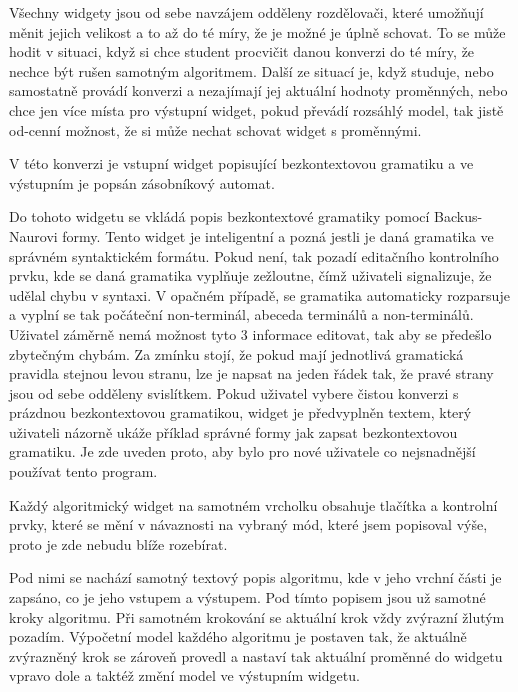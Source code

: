 Všechny widgety jsou od sebe navzájem odděleny rozdělovači, které umožňují měnit jejich velikost a to až do té míry, že je možné je úplně schovat. To se může hodit v situaci, když si chce student procvičit danou konverzi do té míry, že nechce být rušen samotným algoritmem. Další ze situací je, když studuje, nebo samostatně provádí konverzi a nezajímají jej aktuální hodnoty proměnných, nebo chce jen více místa pro výstupní widget, pokud převádí rozsáhlý model, tak jistě od-cenní možnost, že si může nechat schovat widget s proměnnými.

V této konverzi je vstupní widget popisující bezkontextovou gramatiku a ve výstupním je popsán zásobníkový automat.




Do tohoto widgetu se vkládá popis bezkontextové gramatiky pomocí Backus-Naurovi formy. Tento widget je inteligentní a pozná jestli je daná gramatika ve správném syntaktickém formátu. Pokud není, tak pozadí editačního kontrolního prvku, kde se daná gramatika vyplňuje zežloutne, čímž uživateli signalizuje, že udělal chybu v syntaxi. V opačném případě, se gramatika automaticky rozparsuje a vyplní se tak počáteční non-terminál, abeceda terminálů a non-terminálů. Uživatel záměrně nemá možnost tyto 3 informace editovat, tak aby se předešlo zbytečným chybám. Za zmínku stojí, že pokud mají jednotlivá gramatická pravidla stejnou levou stranu, lze je napsat na jeden řádek tak, že pravé strany jsou od sebe odděleny svislítkem. Pokud uživatel vybere čistou konverzi s prázdnou bezkontextovou gramatikou, widget je předvyplněn textem, který uživateli názorně ukáže příklad správné formy jak zapsat bezkontextovou gramatiku. Je zde uveden proto, aby bylo pro nové uživatele co nejsnadnější používat tento program.


Každý algoritmický widget na samotném vrcholku obsahuje tlačítka a kontrolní prvky, které se mění v návaznosti na vybraný mód, které jsem popisoval výše, proto je zde nebudu blíže rozebírat.

Pod nimi se nachází samotný textový popis algoritmu, kde v jeho vrchní části je zapsáno, co je jeho vstupem a výstupem. Pod tímto popisem jsou už samotné kroky algoritmu. Při samotném krokování se aktuální krok vždy zvýrazní žlutým pozadím. Výpočetní model každého algoritmu je postaven tak, že aktuálně zvýrazněný krok se zároveň provedl a nastaví tak aktuální proměnné do widgetu vpravo dole a taktéž změní model ve výstupním widgetu. 

